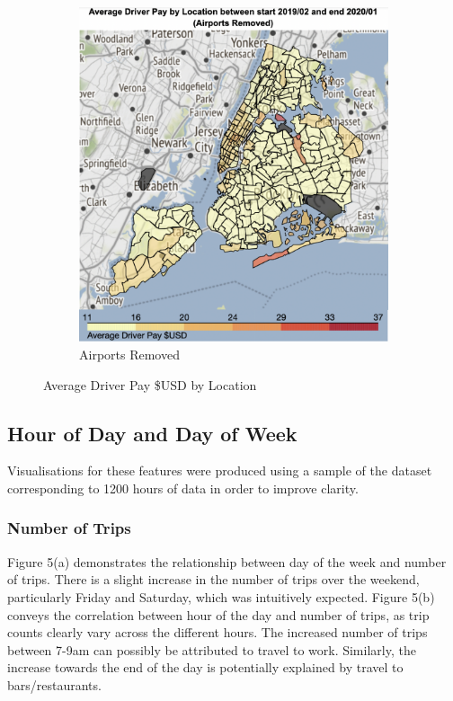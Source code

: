 \documentclass[11pt]{article}
\begin{document}
\begin{figure}[h]
\begin{subfigure}{.5\textwidth}
  \includegraphics[width=1\linewidth]{plots/avg_pay_map_air.png}
  \caption{Airports Removed}
  \label{fig:sub2}
\end{subfigure}
\caption{Average Driver Pay \$USD by Location}
\label{fig:test}
\end{figure}

\subsection{Hour of Day and Day of Week}

Visualisations for these features were produced using a sample of the dataset corresponding to 1200 hours of data in order to improve clarity.

\subsubsection{Number of Trips}

Figure 5(a) demonstrates the relationship between day of the week and number of trips. There is a slight increase in the number of trips over the weekend, particularly Friday and Saturday, which was intuitively expected. Figure 5(b) conveys the correlation between hour of the day and number of trips, as trip counts clearly vary across the different hours. The increased number of trips between 7-9am can possibly be attributed to travel to work. Similarly, the increase towards the end of the day is potentially explained by travel to bars/restaurants.
\end{document}
